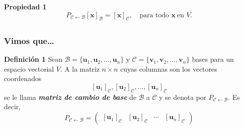 {\begin{frame}
\begin{prop}{\textbf{Propiedad 1}}
	\vspace{-2mm}
	\[	
		P_{\mathcal{C} \leftarrow\mathcal{B}}\left[ \mathbf{x} \right]_{\mathcal{B}}=\left[ \mathbf{x} \right]_{\mathcal{C}},
		\quad \text{para todo }  \mathbf{x} \ \text{en } V.
	\]	
\end{prop}	

\end{frame}
}


\subsection{}

{\nologo
\begin{frame}\frametitle{Vimos que\ldots }
	
	\vspace{-3mm}
	\begin{defi}{\textbf{Definición 1}}\justifying
		Sean $\mathcal{B}=\{\mathbf{u}_1, \mathbf{u}_2, \hdots , \mathbf{u}_n \}$ y $\mathcal{C}=\{\mathbf{v}_1, \mathbf{v}_2, \hdots , \mathbf{v}_n \}$  bases para un espacio  vectorial $V$. A la matriz $n\times n$ cuyas columnas son los vectores coordenados
		\[
		\left[ \mathbf{u}_1 \right]_{\mathcal{C}}, \left[ \mathbf{u}_2 \right]_{\mathcal{C}}, \hdots, \left[ \mathbf{u}_n \right]_{\mathcal{C}}
		\]
		se le llama \textbf{\textit{matriz de cambio de base}} de $\mathcal{B}$ a $\mathcal{C}$ y se denota por $P_{\mathcal{C} \leftarrow\mathcal{B}}$. Es decir,	
		\[	
		P_{\mathcal{C} \leftarrow\mathcal{B}} =
		\left( 
		\begin{array}{c|c|c|c} \left[ \mathbf{u}_1 \right]_{\mathcal{C}} & \left[ \mathbf{u}_2 \right]_{\mathcal{C}} & \cdots & \left[ \mathbf{u}_n \right]_{\mathcal{C}}
		\end{array} 
		\right)
		\]
	\end{defi}	
	

\end{frame}}

